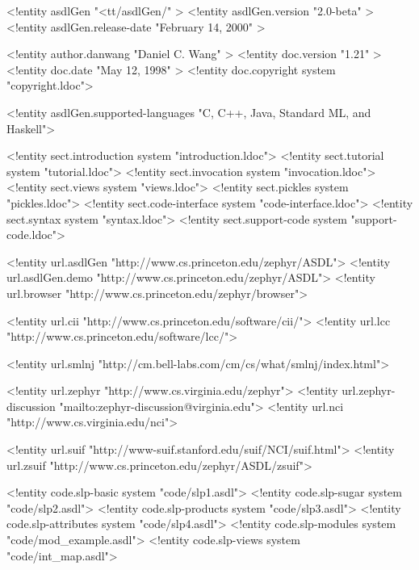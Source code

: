 <!entity asdlGen "<tt/asdlGen/" >
<!entity asdlGen.version "2.0-beta" >
<!entity asdlGen.release-date "February 14, 2000" >

<!entity author.danwang "Daniel C. Wang" >
<!entity doc.version "1.21" >
<!entity doc.date "May 12, 1998" >
<!entity doc.copyright system "copyright.ldoc">

<!entity asdlGen.supported-languages
"C, C++, Java, Standard ML, and Haskell">

<!entity sect.introduction system "introduction.ldoc">
<!entity sect.tutorial system "tutorial.ldoc">
<!entity sect.invocation system "invocation.ldoc">
<!entity sect.views system "views.ldoc">
<!entity sect.pickles system "pickles.ldoc">
<!entity sect.code-interface system "code-interface.ldoc">
<!entity sect.syntax system "syntax.ldoc">
<!entity sect.support-code system "support-code.ldoc">


<!entity url.asdlGen "http://www.cs.princeton.edu/zephyr/ASDL">
<!entity url.asdlGen.demo "http://www.cs.princeton.edu/zephyr/ASDL">
<!entity url.browser "http://www.cs.princeton.edu/zephyr/browser">

<!entity url.cii     "http://www.cs.princeton.edu/software/cii/">
<!entity url.lcc     "http://www.cs.princeton.edu/software/lcc/">

<!entity url.smlnj   "http://cm.bell-labs.com/cm/cs/what/smlnj/index.html">

<!entity url.zephyr  "http://www.cs.virginia.edu/zephyr">
<!entity url.zephyr-discussion  "mailto:zephyr-discussion@virginia.edu">
<!entity url.nci     "http://www.cs.virginia.edu/nci">

<!entity url.suif    "http://www-suif.stanford.edu/suif/NCI/suif.html">
<!entity url.zsuif    "http://www.cs.princeton.edu/zephyr/ASDL/zsuif">

<!entity code.slp-basic      system "code/slp1.asdl">
<!entity code.slp-sugar      system "code/slp2.asdl">
<!entity code.slp-products   system "code/slp3.asdl">
<!entity code.slp-attributes system "code/slp4.asdl">
<!entity code.slp-modules    system "code/mod_example.asdl">
<!entity code.slp-views      system "code/int_map.asdl">
